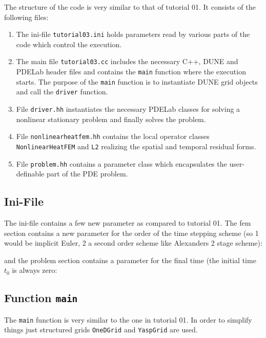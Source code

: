 \documentclass[a4paper,12pt]{article}
\begin{document}
The structure of the code is very similar to that of tutorial 01.
It consists of the following files:
\begin{enumerate}[1)]
\item The ini-file
\lstinline{tutorial03.ini} holds parameters read by various parts of the code
which control the execution.
\item The main file \lstinline{tutorial03.cc} includes the necessary C++,
DUNE and PDELab header files
and contains the \lstinline{main} function where the execution starts.
The purpose of the \lstinline{main} function is
to instantiate DUNE grid objects and call the \lstinline{driver} function.
\item File \lstinline{driver.hh} instantiates the necessary PDELab classes
for solving a nonlinear stationary problem and finally solves the problem.
\item File \lstinline{nonlinearheatfem.hh} contains the local operator classes
\lstinline{NonlinearHeatFEM} and \lstinline{L2} realizing the spatial
and temporal residual forms.
\item File \lstinline{problem.hh} contains a parameter class which
encapsulates the user-definable part of the PDE problem.
\end{enumerate}

\subsection{Ini-File}

The ini-file contains a few new parameter as compared to tutorial 01.
The fem section contains a new parameter for the order of the time stepping
scheme (so 1 would be implicit Euler, 2 a second order scheme like
Alexanders 2 stage scheme):

and the problem section contains a parameter for the final time (the
initial time $t_0$ is always zero:


\subsection{Function \lstinline{main}}

The \lstinline{main} function is very similar to the one in tutorial 01.
In order to simplify things just structured grids \lstinline{OneDGrid}
and \lstinline{YaspGrid} are used.
\end{document}
